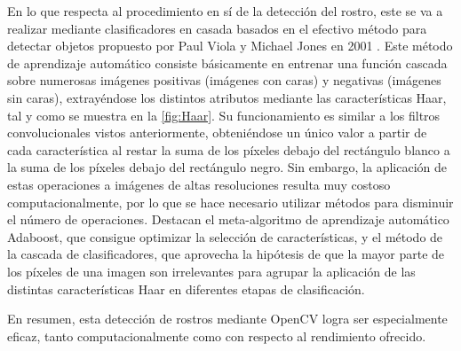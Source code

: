 En lo que respecta al procedimiento en sí de la detección del rostro, este se va a realizar mediante clasificadores en casada basados en el efectivo método para detectar objetos propuesto por Paul Viola y Michael Jones en 2001 \cite{Viola}. Este método de aprendizaje automático consiste básicamente en entrenar una función cascada sobre numerosas imágenes positivas (imágenes con caras) y negativas (imágenes sin caras), extrayéndose los distintos atributos mediante las características Haar, tal y como se muestra en la \autoref{fig:Haar}. Su funcionamiento es similar a los filtros convolucionales vistos anteriormente, obteniéndose un único valor a partir de cada característica al restar la suma de los píxeles debajo del rectángulo blanco a la suma de los píxeles debajo del rectángulo negro. Sin embargo, la aplicación de estas operaciones a imágenes de altas resoluciones resulta muy costoso computacionalmente, por lo que se hace necesario utilizar métodos para disminuir el número de operaciones. Destacan el meta-algoritmo de aprendizaje automático Adaboost, que consigue optimizar la selección de características, y el método de la cascada de clasificadores, que aprovecha la hipótesis de que la mayor parte de los píxeles de una imagen son irrelevantes para agrupar la aplicación de las distintas características Haar en diferentes etapas de clasificación.

En resumen, esta detección de rostros mediante OpenCV logra ser especialmente eficaz, tanto computacionalmente como con respecto al rendimiento ofrecido.